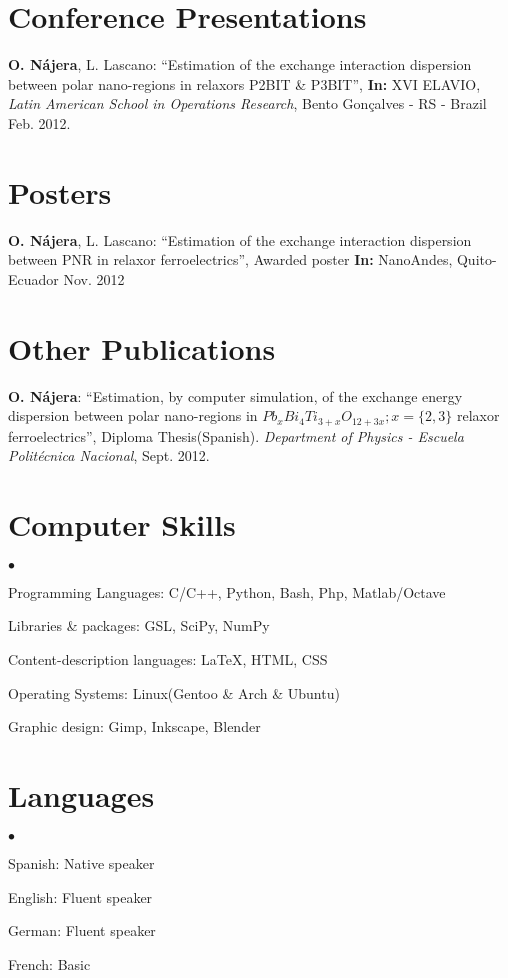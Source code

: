 \documentclass[margin,line]{res}
\newenvironment{list2}{
  \begin{list}{$\bullet$}{%
      \setlength{\itemsep}{0in}
      \setlength{\parsep}{0in} \setlength{\parskip}{0in}
      \setlength{\topsep}{0in} \setlength{\partopsep}{0in} 
      \setlength{\leftmargin}{0.2in}}}{\end{list}}
\begin{document}
\begin{resume}
\section{\sc Conference Presentations}
  {\bf O. Nájera}, L. Lascano: ``Estimation of the exchange interaction dispersion between polar
  nano-regions in relaxors P2BIT \& P3BIT'', {\bf In:} XVI ELAVIO, {\em Latin American School in Operations Research}, Bento Gonçalves - RS - Brazil Feb. 2012.

\section{\sc Posters}
  {\bf O. Nájera}, L. Lascano: ``Estimation of the exchange interaction dispersion between PNR in
  relaxor ferroelectrics'',  Awarded poster {\bf In:} NanoAndes, Quito-Ecuador Nov. 2012

\section{\sc Other Publications}
  {\bf O. Nájera}: ``Estimation, by computer simulation, of the exchange energy dispersion between
  polar nano-regions in $Pb_xBi_4Ti_{3+x}O_{12+3x}; x=\{2,3\}$ relaxor ferroelectrics'', Diploma
  Thesis(Spanish). {\em Department of Physics - Escuela Politécnica Nacional}, Sept. 2012.

\section{\sc Computer Skills}
  \begin{list2}
    \item Programming Languages:  C/C++, Python, Bash, Php, Matlab/Octave
    \item Libraries \& packages: GSL, SciPy, NumPy
    \item Content-description languages: \LaTeX, HTML, CSS
    \item Operating Systems:  Linux(Gentoo \& Arch \& Ubuntu)
    \item Graphic design: Gimp, Inkscape, Blender
  \end{list2}

\section{\sc Languages}
  \begin{list2}
    \item Spanish: Native speaker
    \item English: Fluent speaker
    \item German: Fluent speaker
    \item French: Basic
  \end{list2}
  

\end{resume}
\end{document}
